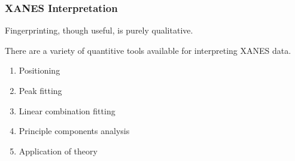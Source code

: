\documentclass[10pt, xcolor=x11names, compress]{beamer}
\begin{document}
\begin{frame}
  \bigskip

  \begin{overlayarea}{\linewidth}{4ex}
  \end{overlayarea}
\end{frame}

\begin{frame}
  \frametitle{XANES Interpretation}
  Fingerprinting, though useful, is purely qualitative.

  \bigskip

  There are a variety of quantitive tools available for interpreting
  XANES data.
  \begin{enumerate}
  \item Positioning
  \item Peak fitting
  \item Linear combination fitting
  \item Principle components analysis
  \item Application of theory
  \end{enumerate}
\end{frame}
\end{document}
